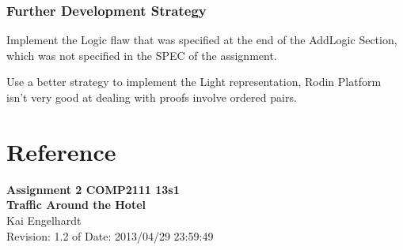 \documentclass[a4paper]{article}
\begin{document}
\subsubsection{Further Development Strategy}
\indent\indent Implement the Logic flaw that was specified at the end of the AddLogic Section, which was not specified in the SPEC of the assignment.

Use a better strategy to implement the Light representation, Rodin Platform isn't very good at dealing with proofs involve ordered pairs.

\newpage

\appendix
\section{Reference}
\begin{center}
\textbf{Assignment 2 COMP2111 13s1\\
Traffic Around the Hotel\\}
Kai Engelhardt\\
Revision: 1.2 of Date: 2013/04/29 23:59:49
\end{center}
\end{document}
